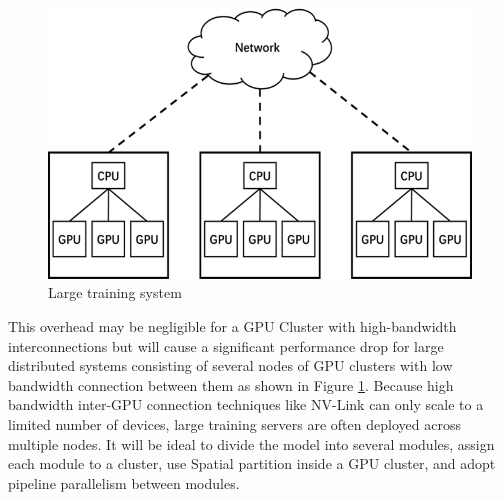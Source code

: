 \documentclass[sigplan, nonacm]{acmart}\settopmatter{printfolios=true,printccs=false,printacmref=false}
\begin{document}
 \begin{figure}[htbp]
  \centering
  \includegraphics[scale=0.7]{networktopo.png}
  \caption{Large training system}
  \label{fig:networktopo}
\end{figure} This overhead may be negligible for a GPU Cluster with high-bandwidth interconnections but will cause a significant performance drop for large distributed systems consisting of several nodes of GPU clusters with low bandwidth connection between them as shown in Figure \ref{fig:networktopo}. Because high bandwidth inter-GPU connection techniques like NV-Link can only scale to a limited number of devices, large training servers are often deployed across multiple nodes. It will be ideal to divide the model into several modules, assign each module to a cluster, use Spatial partition inside a GPU cluster, and adopt pipeline parallelism between modules.\par
\end{document}
